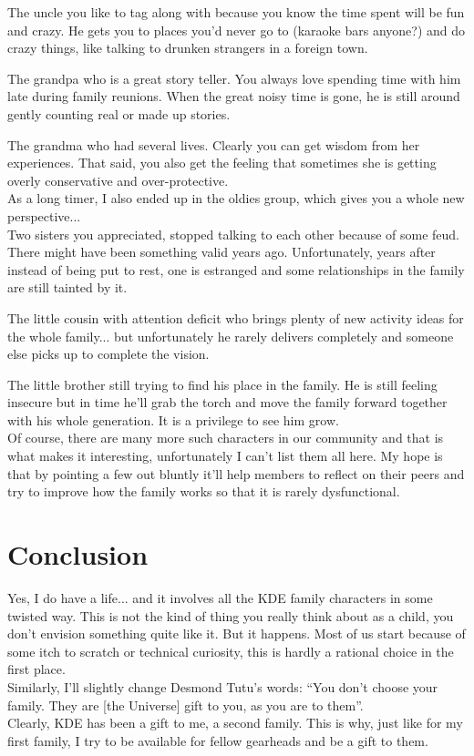 The uncle you like to tag along with because you know the time spent will be
fun and crazy. He gets you to places you'd never go to (karaoke bars anyone?)
and do crazy things, like talking to drunken strangers in a foreign town.

The grandpa who is a great story teller. You always love spending time with him
late during family reunions. When the great noisy time is gone, he is still
around gently counting real or made up stories.

The grandma who had several lives. Clearly you can get wisdom from her
experiences. That said, you also get the feeling that sometimes she is getting
overly conservative and over-protective. \\

As a long timer, I also ended up in the oldies group, which gives you a whole
new perspective... \\

Two sisters you appreciated, stopped talking to each other because of some feud.
There might have been something valid years ago. Unfortunately, years after
instead of being put to rest, one is estranged and some relationships in the
family are still tainted by it.

The little cousin with attention deficit who brings plenty of new activity
ideas for the whole family... but unfortunately he rarely delivers completely
and someone else picks up to complete the vision.

The little brother still trying to find his place in the family. He is still
feeling insecure but in time he'll grab the torch and move the family forward
together with his whole generation. It is a privilege to see him grow. \\

Of course, there are many more such characters in our community and that is what
makes it interesting, unfortunately I can't list them all here. My hope is that
by pointing a few out bluntly it'll help members to reflect on their peers and
try to improve how the family works so that it is rarely dysfunctional.

\section*{Conclusion}
Yes, I do have a life... and it involves all the KDE family characters in some
twisted way. This is not the kind of thing you really think about as a child, you
don't envision something quite like it. But it happens. Most of us start because
of some itch to scratch or technical curiosity, this is hardly a rational choice
in the first place. \\

Similarly, I'll slightly change Desmond Tutu's words: ``You don’t choose your
family. They are [the Universe] gift to you, as you are to them''. \\

Clearly, KDE has been a gift to me, a second family. This is why, just like for
my first family, I try to be available for fellow gearheads and be a gift to
them.

